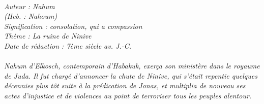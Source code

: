 \BFont
\noindent\hrulefill
{\footnotesize
\textit{
\bigskip
{\centering{}
\\Auteur : Nahum
\\(Heb. : Nahoum)
\\Signification : consolation, qui a compassion
\\Thème : La ruine de Ninive
\\Date de rédaction : 7ème siècle av. J.-C.\\}
}
\textit{
\\Nahum d’Elkosch, contemporain d’Habakuk, exerça son ministère dans le royaume de Juda. Il fut chargé d’annoncer la chute de Ninive, qui s'était repentie quelques décennies plus tôt suite à la prédication de Jonas, et multiplia de nouveau ses actes d’injustice et de violences au point de terroriser tous les peuples alentour.\bigskip
}
}
\par\nobreak\noindent\hrulefill
